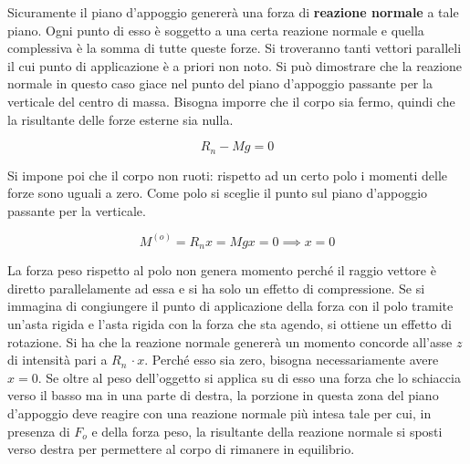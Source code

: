 \begin{figure}[htpb]
\end{figure}
\FloatBarrier
Sicuramente il piano d'appoggio genererà una forza di \textbf{reazione normale} a tale piano. Ogni punto di esso è soggetto a una certa reazione normale e quella complessiva è la somma di tutte queste forze. Si troveranno tanti vettori paralleli il cui punto di applicazione è a priori non noto. Si può dimostrare che la reazione normale in questo caso giace nel punto del piano d'appoggio passante per la verticale del centro di massa. Bisogna imporre che il corpo sia fermo, quindi che la risultante delle forze esterne sia nulla.

\[
	R_n-Mg=0
\]

Si impone poi che il corpo non ruoti: rispetto ad un certo polo i momenti delle forze sono uguali a zero. Come polo si sceglie il punto sul piano d'appoggio passante per la verticale.

\[
	M^{(o)} = R_n x = Mgx =0 \implies x=0
\]

La forza peso rispetto al polo non genera momento perché il raggio vettore è diretto parallelamente ad essa e si ha solo un effetto di compressione. Se si immagina di congiungere il punto di applicazione della forza con il polo tramite un'asta rigida e l'asta rigida con la forza che sta agendo, si ottiene un effetto di rotazione. Si ha che la reazione normale genererà un momento concorde all'asse $z$ di intensità pari a $R_n\,\cdot x$.
Perché esso sia zero, bisogna necessariamente avere $x=0$. Se oltre al peso dell'oggetto si applica su di esso una forza che lo schiaccia verso il basso ma in una parte di destra, la porzione in questa zona del piano d'appoggio deve reagire con una reazione normale più intesa tale per cui, in presenza di $F_o$ e della forza peso, la risultante della reazione normale si sposti verso destra per permettere al corpo di rimanere in equilibrio.

